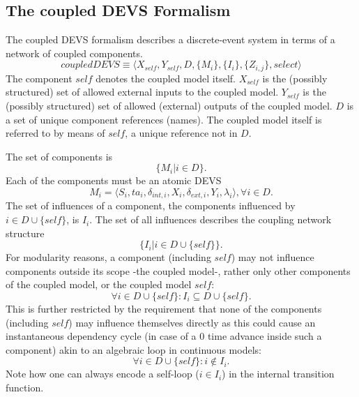 
\subsection{The coupled DEVS Formalism} 
The coupled DEVS formalism describes a discrete-event system in terms of a network of coupled components.
\begin{equation}
    coupledDEVS \equiv \langle X_{self}, Y_{self}, D, \{M_i\}, \{I_i\}, \{Z_{i,j}\}, select \rangle
\end{equation}
The component $self$ denotes the coupled model itself. $X_{self}$ is the (possibly structured) set of allowed external inputs 
to the coupled model. $Y_{self}$ is the (possibly structured) set of allowed (external) outputs of the coupled model. $D$ is 
a set of unique component references (names). The coupled model itself is referred to by means of $self$, a unique reference 
not in $D$.

The set of components is
\begin{equation}
    \{M_i | i \in D\}.
\end{equation}
Each of the components must be an atomic DEVS
\begin{equation}
    M_i = \langle S_i, ta_i, \delta_{int, i}, X_i, \delta_{ext, i}, Y_i, \lambda_i \rangle , \forall i \in D.
\end{equation}
The set of influences of a component, the components influenced by $i \in D \cup \{self\}$, is $I_i$. The set of all influences 
describes the coupling network structure
\begin{equation}
    \{ I_i | i \in D \cup \{self\}\}.
\end{equation}
For modularity reasons, a component (including $self$) may not influence components outside its scope -the coupled model-, 
rather only other components of the coupled model, or the coupled model $self$:
\begin{equation}
    \forall i \in D \cup \{self\}: I_i \subseteq D \cup \{self\}.
\end{equation}
This is further restricted by the requirement that none of the components (including $self$) may influence themselves directly 
as this could cause an instantaneous dependency cycle (in case of a 0 time advance inside such a component) akin to an algebraic 
loop in continuous models:
\begin{equation}
    \forall i \in D \cup \{self\}: i \not \in I_i.
\end{equation}
Note how one can always encode a self-loop ($i \in I_i$) in the internal transition function.


